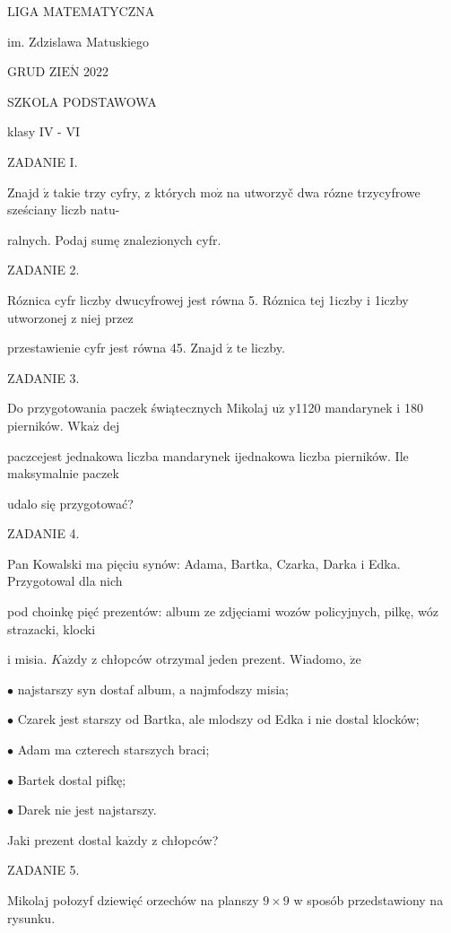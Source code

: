 \documentclass[a4paper,12pt]{article}
\begin{document}
LIGA MATEMATYCZNA

im. Zdzislawa Matuskiego

GRUD Z$\mathrm{I}\mathrm{E}\acute{\mathrm{N}}$ 2022

SZKOLA PODSTAWOWA

klasy IV - VI

ZADANIE I.

Znajd $\acute{\mathrm{z}}$ takie trzy cyfry, z których $\mathrm{m}\mathrm{o}\dot{\mathrm{z}}$ na utworzyč dwa rózne trzycyfrowe sześciany liczb natu-

ralnych. Podaj sumę znalezionych cyfr.

ZADANIE 2.

Róznica cyfr liczby dwucyfrowej jest równa 5. Róznica tej 1iczby i 1iczby utworzonej z niej przez

przestawienie cyfr jest równa 45. Znajd $\acute{\mathrm{z}}$ te liczby.

ZADANIE 3.

Do przygotowania paczek świątecznych Mikolaj $\mathrm{u}\dot{\mathrm{z}}$ y1120 mandarynek i 180 pierników. $\mathrm{W}\mathrm{k}\mathrm{a}\dot{\mathrm{z}}$ dej

paczcejest jednakowa liczba mandarynek ijednakowa liczba pierników. Ile maksymalnie paczek

udalo się przygotować?

ZADANIE 4.

Pan Kowalski ma pięciu synów: Adama, Bartka, Czarka, Darka i Edka. Przygotowal dla nich

pod choinkę pięć prezentów: album ze zdjęciami wozów policyjnych, pilkę, wóz strazacki, klocki

i misia. $K\mathrm{a}\dot{\mathrm{z}}\mathrm{d}\mathrm{y}$ z chłopców otrzymal jeden prezent. Wiadomo, $\dot{\mathrm{z}}\mathrm{e}$

$\bullet$ najstarszy syn dostaf album, a najmfodszy misia;

$\bullet$ Czarek jest starszy od Bartka, ale mlodszy od Edka i nie dostal klocków;

$\bullet$ Adam ma czterech starszych braci;

$\bullet$ Bartek dostal pifkę;

$\bullet$ Darek nie jest najstarszy.

Jaki prezent dostal $\mathrm{k}\mathrm{a}\dot{\mathrm{z}}\mathrm{d}\mathrm{y}$ z chłopców?

ZADANIE 5.

Mikolaj połozyf dziewięć orzechów na planszy $9 \times 9$ w sposób przedstawiony na rysunku.
\end{document}
